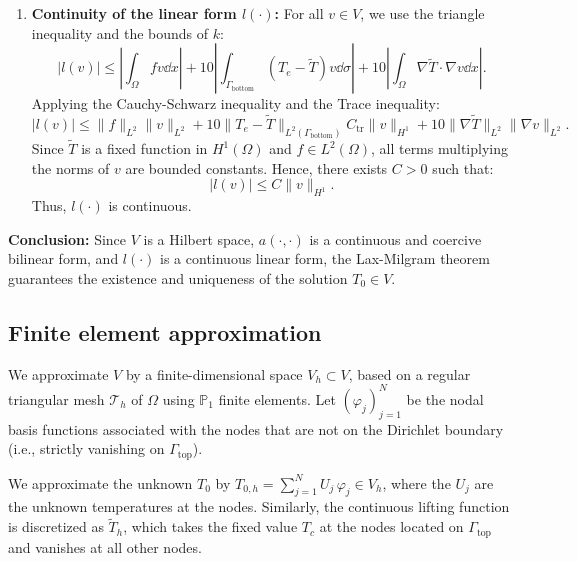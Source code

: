 \begin{enumerate}
  \item \textbf{Continuity of the linear form $l(\cdot)$:}
  For all $v \in V$, we use the triangle inequality and the bounds of $k$:
  \begin{equation*}
      |l(v)| \le \displaystyle\left\lvert \int_\Omega f v \dd x \right \rvert+ 10 \displaystyle\left\lvert \int_{\Gamma_{\text{bottom}}} (T_e - \tilde{T}) v \dd\sigma \right \rvert+ 10 \displaystyle\left\lvert \int_\Omega  \nabla \tilde{T} \cdot \nabla v \dd x \right\rvert.
  \end{equation*}
  Applying the Cauchy-Schwarz inequality and the Trace inequality:
  \begin{equation*}
      |l(v)| \le \|f\|_{L^2} \|v\|_{L^2} + 10 \|T_e - \tilde{T}\|_{L^2(\Gamma_{\text{bottom}})} C_{\text{tr}} \|v\|_{H^1} + 10 \|\nabla \tilde{T}\|_{L^2} \|\nabla v\|_{L^2}.
  \end{equation*}
  Since $\tilde{T}$ is a fixed function in $H^1(\Omega)$ and $f \in L^2(\Omega)$, all terms multiplying the norms of $v$ are bounded constants. Hence, there exists $C > 0$ such that:
  \begin{equation*}
      |l(v)| \le C \|v\|_{H^1}.
  \end{equation*}
  Thus, $l(\cdot)$ is continuous.
\end{enumerate}

\textbf{Conclusion:} Since $V$ is a Hilbert space, $a(\cdot, \cdot)$ is a continuous and coercive bilinear form, and $l(\cdot)$ is a continuous linear form, the Lax-Milgram theorem guarantees the existence and uniqueness of the solution $T_0 \in V$.

\subsection{Finite element approximation}

We approximate $V$ by a finite-dimensional space $V_h \subset V$, based on a regular triangular mesh $\mathcal{T}_h$ of $\Omega$ using $\mathbb{P}_1$ finite elements. Let ${(\varphi_j)}_{j=1}^N$ be the nodal basis functions associated with the nodes that are not on the Dirichlet boundary (i.e., strictly vanishing on $\Gamma_{\text{top}}$).

We approximate the unknown $T_0$ by $T_{0,h} = \sum_{j=1}^N U_j\,\varphi_j \in V_h$, where the $U_j$ are the unknown temperatures at the nodes. Similarly, the continuous lifting function is discretized as $\tilde{T}_h$, which takes the fixed value $T_c$ at the nodes located on $\Gamma_{\text{top}}$ and vanishes at all other nodes.

